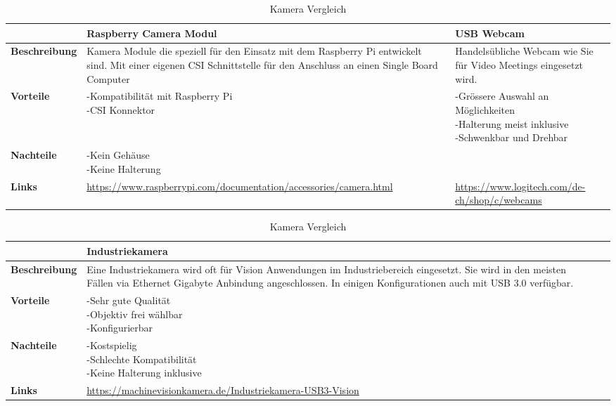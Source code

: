 \begin{table}[H]
\centering
\small
\begin{tabularx}{\textwidth}{|l|X|X|}
\hline
\textbf{} & \textbf{Raspberry Camera Modul} & \textbf{USB Webcam}\\
  \hline
  \textbf{Beschreibung} & Kamera Module die speziell für den Einsatz mit dem Raspberry Pi entwickelt sind. Mit einer eigenen CSI Schnittstelle für den Anschluss an einen Single Board Computer & Handelsübliche Webcam wie Sie für Video Meetings eingesetzt wird. \\
  \hline
  \textbf{Vorteile}  & \makecell{-Kompatibilität mit Raspberry Pi \\ -CSI Konnektor} & \makecell{-Grössere Auswahl an Möglichkeiten \\ -Halterung meist inklusive \\ -Schwenkbar und Drehbar} \\
  \hline
  \textbf{Nachteile} & \makecell{-Kein Gehäuse \\ -Keine Halterung} & \makecell{} \\
  \hline
  \textbf{Links} & \url{https://www.raspberrypi.com/documentation/accessories/camera.html} & \url{https://www.logitech.com/de-ch/shop/c/webcams} \\
  \hline
\end{tabularx}
\begin{tabularx}{\textwidth}{|l|X|X|}
\hline
\textbf{} & \textbf{Industriekamera} & \textbf{} \\
  \hline
  \textbf{Beschreibung} & Eine Industriekamera wird oft für Vision Anwendungen im Industriebereich eingesetzt. Sie wird in den meisten Fällen via Ethernet Gigabyte Anbindung angeschlossen. In einigen Konfigurationen auch mit USB 3.0 verfügbar. & \\
  \hline
  \textbf{Vorteile}  & \makecell{-Sehr gute Qualität \\ -Objektiv frei wählbar \\ -Konfigurierbar} & \makecell{} \\
  \hline
  \textbf{Nachteile} & \makecell{-Kostspielig \\ -Schlechte Kompatibilität \\ -Keine Halterung inklusive} & \makecell{} \\
  \hline
  \textbf{Links} & \url{https://machinevisionkamera.de/Industriekamera-USB3-Vision} & \\
  \hline
\end{tabularx}
\caption{Kamera Vergleich}
\label{table:camera-compare}
\end{table}


